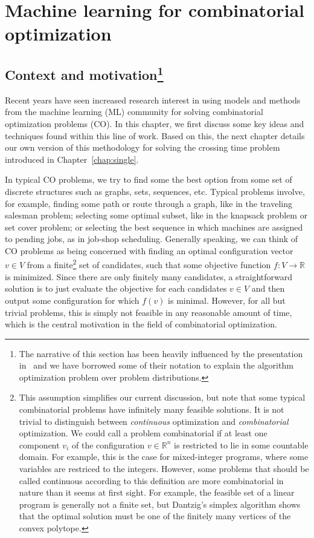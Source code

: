 \documentclass[a4paper]{report}
\author{\Large Jeroen van Riel \\[6em] {\it Combined Master's Thesis} \\[0.6em] Industrial and Applied Mathematics \\ Computer Science and Engineering  \\[3em] {\it Supervisors} \\[0.6em] Marko Boon \\ Stella Kapodistria \\ Mykola Pechenizkiy \\ Danil Provodin  \\[8em] October 2025 \\[0.6em] Eindhoven University of Technology}
\date{}
\title{\mytitle}
\theoremstyle{definition}
\theoremstyle{plain}
\begin{document}
\chapter{Machine learning for combinatorial optimization}\label{chap:ml-co}

\section[Context and motivation]{Context and motivation\footnote{The narrative of this section has
    been heavily influenced by the presentation
    in~\cite{bengioMachineLearningCombinatorial2020} and we have borrowed some
    of their notation to explain the algorithm optimization problem over problem
    distributions.}}

Recent years have seen increased research interest in using models and methods
from the machine learning (ML) community for solving combinatorial optimization
problems (CO).
%
In this chapter, we first discuss some key ideas and techniques found within
this line of work.
%
Based on this, the next chapter details our own version of this methodology for
solving the crossing time problem introduced in Chapter~\ref{chap:single}.

In typical CO problems, we try to find some the best option from some set of
discrete structures such as graphs, sets, sequences, etc.
%
Typical problems involve, for example, finding some path or route through a
graph, like in the traveling salesman problem; selecting some optimal subset,
like in the knapsack problem or set cover problem; or selecting the best
sequence in which machines are assigned to pending jobs, as in job-shop
scheduling.
%
Generally speaking, we can think of CO problems as being concerned with finding
an optimal configuration vector $v \in V$ from a finite\footnote{This assumption
  simplifies our current discussion, but note that some typical combinatorial
  problems have infinitely many feasible solutions.
%
  It is not trivial to distinguish between \emph{continuous} optimization
  and \emph{combinatorial} optimization.
%
  We could call a problem combinatorial if at least one component $v_i$ of the
  configuration $v \in \mathbb{R}^n$ is restricted to lie in some countable domain.
%
  For example, this is the case for mixed-integer programs, where some
  variables are restriced to the integers.
%
  However, some problems that should be called continuous according to this
  definition are more combinatorial in nature than it seems at first sight. For
  example, the feasible set of a linear program is generally not a finite set,
  but Dantzig's simplex algorithm shows that the optimal solution must be one of
  the finitely many vertices of the convex polytope.} set of candidates, such
that some objective function $f : V \rightarrow \mathbb{R}$ is minimized.
%
Since there are only finitely many candidates, a straightforward solution is to
just evaluate the objective for each candidates $v \in V$ and then output some
configuration for which $f(v)$ is minimal.
%
However, for all but trivial problems, this is simply not feasible in any
reasonable amount of time, which is the central motivation in the field of
combinatorial optimization.
\end{document}
